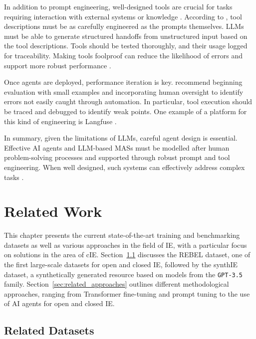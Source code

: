 \documentclass[a4paper,oneside,bibliography=totoc]{scrbook}
\begin{document}
In addition to prompt engineering, well-designed tools are crucial for tasks requiring interaction with external systems or knowledge \cite{OpenAI2025,Anthropic2024}. According to \citet{Anthropic2024}, tool descriptions must be as carefully engineered as the prompts themselves. \acp{LLM} must be able to generate structured handoffs from unstructured input based on the tool descriptions. Tools should be tested thoroughly, and their usage logged for traceability. Making tools foolproof can reduce the likelihood of errors and support more robust performance \cite{Anthropic2024}.

Once agents are deployed, performance iteration is key. \citet{Hadfield2025} recommend beginning evaluation with small examples and incorporating human oversight to identify errors not easily caught through automation. In particular, tool execution should be traced and debugged to identify weak points. One example of a platform for this kind of engineering is Langfuse \cite{LGFT2025}.

In summary, given the limitations of \acp{LLM}, careful agent design is essential. Effective \ac{AI} agents and \ac{LLM}-based \acp{MAS} must be modelled after human problem-solving processes and supported through robust prompt and tool engineering. When well designed, such systems can effectively address complex tasks \cite{Hadfield2025}.

\chapter{Related Work}
\label{ch:related_work_chapter}

This chapter presents the current state-of-the-art training and benchmarking datasets as well as various approaches in the field of \ac{IE}, with a particular focus on solutions in the area of \ac{cIE}. Section~\ref{sec:related_datasets} discusses the REBEL dataset, one of the first large-scale datasets for open and closed \ac{IE}, followed by the synthIE dataset, a synthetically generated resource based on models from the \texttt{GPT-3.5} family. Section~\ref{sec:related_approaches} outlines different methodological approaches, ranging from Transformer fine-tuning and prompt tuning to the use of \ac{AI} agents for open and closed \ac{IE}.

\section{Related Datasets}
\label{sec:related_datasets}
\end{document}
